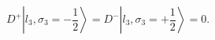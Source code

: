 \begin{equation}
D^{+}\left| l_{3},\sigma _{3}=-\frac{1}{2}\right\rangle =D^{-}\left|
l_{3},\sigma _{3}=+\frac{1}{2}\right\rangle =0.
\label{eq45}
\end{equation}

